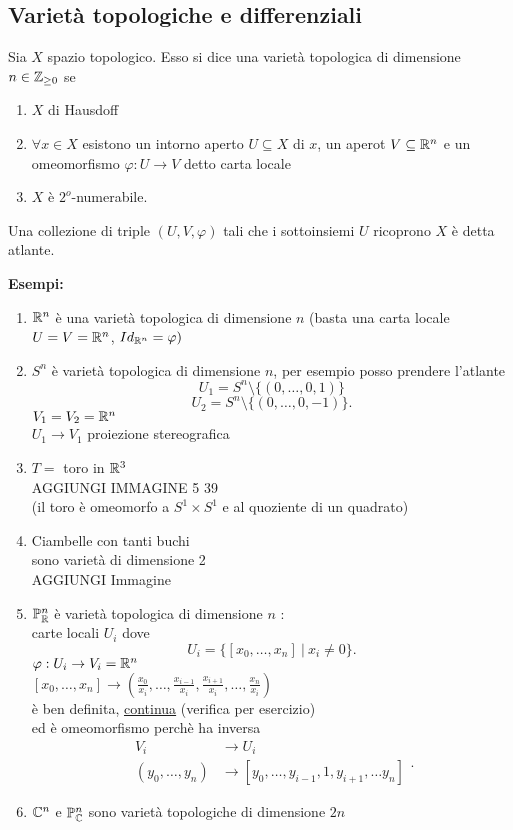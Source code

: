 \documentclass[12px]{article}
\begin{document}
	\subsection{Varietà topologiche e differenziali}
	\begin{defi}
		Sia  $X$ spazio topologico. Esso si dice una varietà topologica di dimensione $n\in\mathbb{Z}_{\geq 0}$ se
		\begin{enumerate}
			\item $X$ di Hausdoff
			\item  $\forall x\in X$ esistono un intorno aperto  $U\subseteq X$ di $x$, un aperot  $V\subseteq \mathbb{R}^n$ e un omeomorfismo  $ \varphi: U \rightarrow V$ detto carta locale
			\item $X$ è $2^o$-numerabile.
		\end{enumerate}
		Una collezione di triple $(U,V, \varphi)$ tali che i sottoinsiemi $U$ ricoprono  $X$ è detta atlante.
\end{defi}
\textbf{Esempi:}
\begin{enumerate}
	\item $\mathbb{R}^n$ è una varietà topologica di dimensione  $n$ (basta una carta locale  $U = V = \mathbb{R}^n$,  $Id_{\mathbb{R}^n} = \varphi)$ 
	\item $S^n$ è varietà topologica di dimensione  $n$, per esempio posso prendere l'atlante\\
		\[
		U_1 = S^n\setminus\{(0,\ldots,0,1)\} \]\[
			U_2 = S^n\setminus\{(0,\ldots,0,-1)\}
		.\] 
		$V_1 = V_2 = \mathbb{R}^n$ \\
		$U_1 \rightarrow V_1$ proiezione stereografica 
	\item $T = $ toro in  $\mathbb{R}^3$\\
		AGGIUNGI IMMAGINE 5 39\\
		(il toro è omeomorfo a  $S^1\times S^1$ e al quoziente di un quadrato)
	\item Ciambelle con tanti buchi\\
		sono varietà di dimensione 2\\
		AGGIUNGI Immagine
	\item  $\mathbb{P}^n_{\mathbb{R}}$ è varietà topologica di dimensione  $n$ :\\
		carte locali $U_i$ dove 
		 \[
			 U_i = \{[x_0,\ldots,x_n]\ | \ x_i\neq 0 \}
		.\] 
		$ \varphi : U_i \rightarrow V_i = \mathbb{R}^n$\\
		$[x_0,\ldots,x_n] \rightarrow (\frac {x_0} {x_i},\ldots,  \frac{x_{i-1}}{x_i},\frac{x_{i+1}}{x_i},\ldots, \frac {x_n} {x_i})$\\
		è ben definita, \underline{continua} (verifica per esercizio)\\
	 ed è omeomorfismo perchè ha inversa
	 \[
	 \begin{aligned}
		 V_i &\rightarrow U_i\\
		 (y_0,\ldots, y_n)& \rightarrow [y_0, \ldots, y_{i-1}, 1, y_{i+1},\ldots y_n]
	 \end{aligned}
	 .\] 
 \item $\mathbb{C}^n$ e  $\mathbb{P}^n_{\mathbb{C}}$ sono varietà topologiche di dimensione  $2n$
\end{enumerate}
\end{document}
